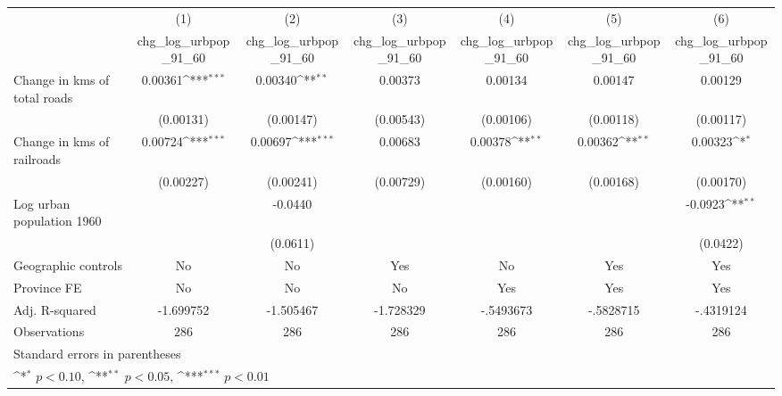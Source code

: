 {
\def\sym#1{\ifmmode^{#1}\else\(^{#1}\)\fi}
\begin{tabular}{l*{6}{c}}
\hline\hline
                    &\multicolumn{1}{c}{(1)}&\multicolumn{1}{c}{(2)}&\multicolumn{1}{c}{(3)}&\multicolumn{1}{c}{(4)}&\multicolumn{1}{c}{(5)}&\multicolumn{1}{c}{(6)}\\
                    &\multicolumn{1}{c}{chg\_log\_urbpop\_91\_60}&\multicolumn{1}{c}{chg\_log\_urbpop\_91\_60}&\multicolumn{1}{c}{chg\_log\_urbpop\_91\_60}&\multicolumn{1}{c}{chg\_log\_urbpop\_91\_60}&\multicolumn{1}{c}{chg\_log\_urbpop\_91\_60}&\multicolumn{1}{c}{chg\_log\_urbpop\_91\_60}\\
\hline
Change in kms of total roads&     0.00361\sym{***}&     0.00340\sym{**} &     0.00373         &     0.00134         &     0.00147         &     0.00129         \\
                    &   (0.00131)         &   (0.00147)         &   (0.00543)         &   (0.00106)         &   (0.00118)         &   (0.00117)         \\
[1em]
Change in kms of railroads&     0.00724\sym{***}&     0.00697\sym{***}&     0.00683         &     0.00378\sym{**} &     0.00362\sym{**} &     0.00323\sym{*}  \\
                    &   (0.00227)         &   (0.00241)         &   (0.00729)         &   (0.00160)         &   (0.00168)         &   (0.00170)         \\
[1em]
Log urban population 1960&                     &     -0.0440         &                     &                     &                     &     -0.0923\sym{**} \\
                    &                     &    (0.0611)         &                     &                     &                     &    (0.0422)         \\
\hline
Geographic controls &          No         &          No         &         Yes         &          No         &         Yes         &         Yes         \\
Province FE         &          No         &          No         &          No         &         Yes         &         Yes         &         Yes         \\
Adj. R-squared      &   -1.699752         &   -1.505467         &   -1.728329         &   -.5493673         &   -.5828715         &   -.4319124         \\
Observations        &         286         &         286         &         286         &         286         &         286         &         286         \\
\hline\hline
\multicolumn{7}{l}{\footnotesize Standard errors in parentheses}\\
\multicolumn{7}{l}{\footnotesize \sym{*} \(p<0.10\), \sym{**} \(p<0.05\), \sym{***} \(p<0.01\)}\\
\end{tabular}
}
